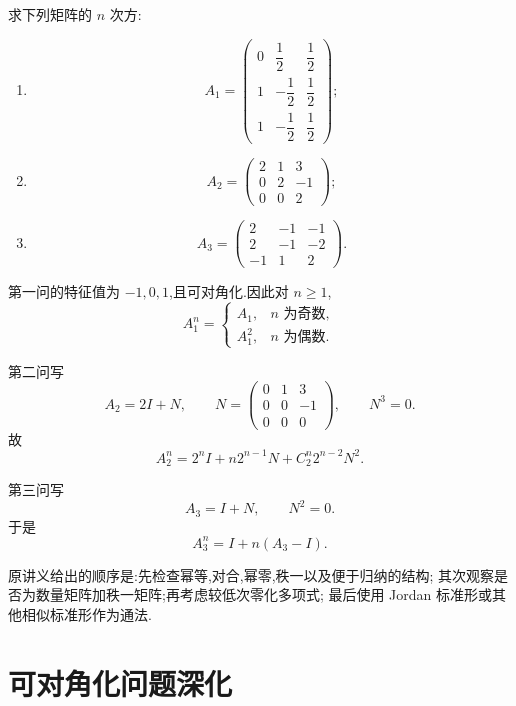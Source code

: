 \begin{example}
求下列矩阵的 $n$ 次方:
\begin{enumerate}
    \item
    \[
    A_1=
    \begin{pmatrix}
    0&\dfrac12&\dfrac12\\
    1&-\dfrac12&\dfrac12\\
    1&-\dfrac12&\dfrac12
    \end{pmatrix};
    \]
    \item
    \[
    A_2=
    \begin{pmatrix}
    2&1&3\\
    0&2&-1\\
    0&0&2
    \end{pmatrix};
    \]
    \item
    \[
    A_3=
    \begin{pmatrix}
    2&-1&-1\\
    2&-1&-2\\
    -1&1&2
    \end{pmatrix}.
    \]
\end{enumerate}
\end{example}
\exampleblank

\begin{solution}
第一问的特征值为 $-1,0,1$,且可对角化.因此对 $n\geq1$,
\[
\boxed{
A_1^n=
\begin{cases}
A_1,&n\text{ 为奇数},\\
A_1^2,&n\text{ 为偶数}.
\end{cases}
}
\]

第二问写
\[
A_2=2I+N,
\qquad
N=
\begin{pmatrix}
0&1&3\\
0&0&-1\\
0&0&0
\end{pmatrix},
\qquad N^3=0.
\]
故
\[
\boxed{
A_2^n
=
2^nI
+n2^{n-1}N
+C_2^n2^{n-2}N^2.
}
\]

第三问写
\[
A_3=I+N,
\qquad N^2=0.
\]
于是
\[
\boxed{
A_3^n=I+n(A_3-I).
}
\]
\end{solution}

\begin{remark}[快速处理矩阵幂]
原讲义给出的顺序是:先检查幂等,对合,幂零,秩一以及便于归纳的结构;
其次观察是否为数量矩阵加秩一矩阵;再考虑较低次零化多项式;
最后使用 Jordan 标准形或其他相似标准形作为通法.
\end{remark}


\newpage

\section{可对角化问题深化}

